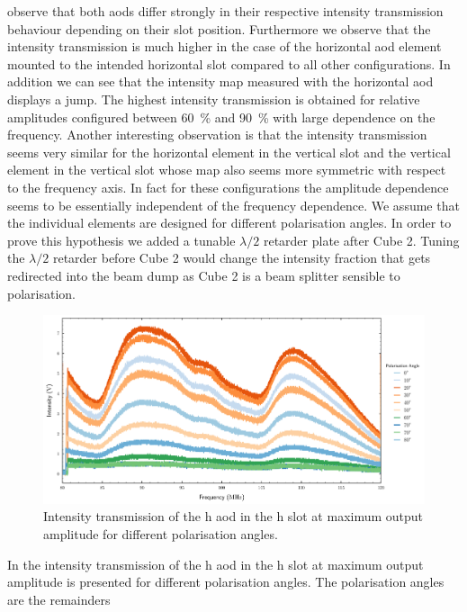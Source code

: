 observe that both \gls{aod}s differ strongly in their respective intensity
transmission behaviour depending on their slot position. Furthermore we
observe that the intensity transmission is much higher in the case of the
horizontal \gls{aod} element mounted to the intended horizontal slot compared
to all other configurations. In addition we can see that the intensity map
measured with the horizontal \gls{aod} displays a jump. The highest intensity
transmission is obtained for relative amplitudes configured between
\SI{60}{\percent} and \SI{90}{\percent} with large dependence on the
frequency. Another interesting observation is that the intensity transmission
seems very similar for the horizontal element in the vertical slot and the
vertical element in the vertical slot whose map also seems more symmetric with
respect to the frequency axis. In fact for these configurations the amplitude
dependence seems to be essentially independent of the frequency dependence.
We assume that the individual elements are designed for different
polarisation angles. In order to prove this hypothesis we added a tunable
$\lambda/2$ retarder plate after Cube 2. Tuning the $\lambda/2$ retarder
before Cube 2 would change the intensity fraction that gets redirected into
the beam dump as Cube 2 is a beam splitter sensible to polarisation.
\begin{figure}[htb]
  \centering
  \includegraphics[width=\textwidth]
  {../figure/intensity/distribution/polarisation-horizontal.pdf}
  \caption{Intensity transmission of the \gls{h} \gls{aod} in the \gls{h} slot
    at maximum output amplitude for different polarisation angles.
  }\label{fig:intensity_polarisation_h}
\end{figure}
In  the intensity transmission of the
\gls{h} \gls{aod} in the \gls{h} slot at maximum output amplitude is presented
for different polarisation angles. The polarisation angles are the remainders
